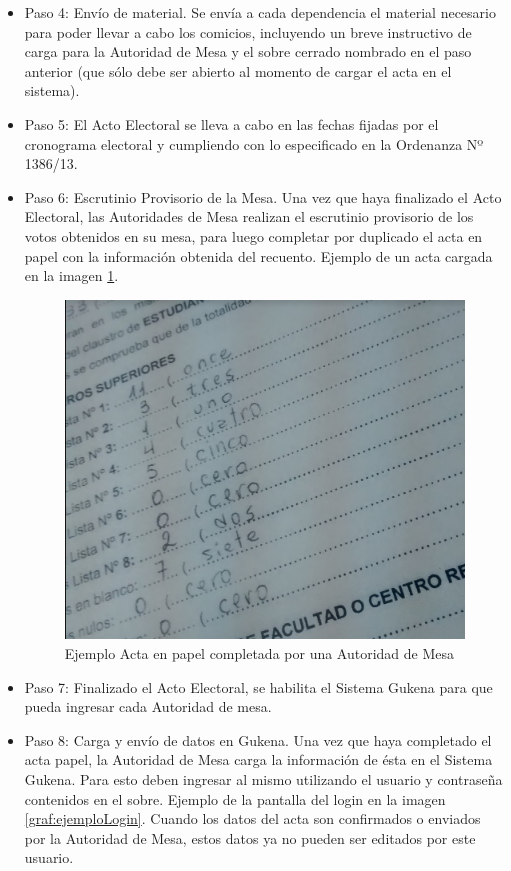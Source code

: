 \begin{itemize}
\item Paso 4: Envío de material. Se envía a cada dependencia el material necesario para poder llevar a cabo los comicios, incluyendo un breve instructivo de carga para la Autoridad de Mesa y el sobre cerrado nombrado en el paso anterior (que sólo debe ser abierto al momento de cargar el acta en el sistema).
\item Paso 5: El Acto Electoral se lleva a cabo en las fechas fijadas por el cronograma electoral y cumpliendo con lo especificado en la Ordenanza Nº 1386/13.
\item Paso 6: Escrutinio Provisorio de la Mesa. 
Una vez que haya finalizado el Acto Electoral, las Autoridades de Mesa realizan el escrutinio provisorio de los votos obtenidos en su mesa, para luego completar por duplicado el acta en papel con la información obtenida del recuento. Ejemplo de un acta cargada en la imagen \ref{graf:ejemploActa}.

\begin{figure}[h!]
    \begin{center}
        \includegraphics[scale=0.25]{f4P4qmrKXY.png}
    \end{center}
  \caption{Ejemplo Acta en papel completada por una Autoridad de Mesa}
  \label{graf:ejemploActa}
\end{figure}

\item Paso 7: Finalizado el Acto Electoral, se habilita el Sistema Gukena para que pueda ingresar cada Autoridad de mesa.
\item Paso 8: Carga y envío de datos en Gukena. Una vez que haya completado el acta papel, la Autoridad de Mesa carga la información de ésta en el Sistema Gukena. Para esto deben ingresar al mismo utilizando el usuario y contraseña contenidos en el sobre. Ejemplo de la pantalla del login en la imagen \ref{graf:ejemploLogin}.
Cuando los datos del acta son confirmados o enviados por la Autoridad de Mesa, estos datos ya no pueden ser editados por este usuario.


\end{itemize}
